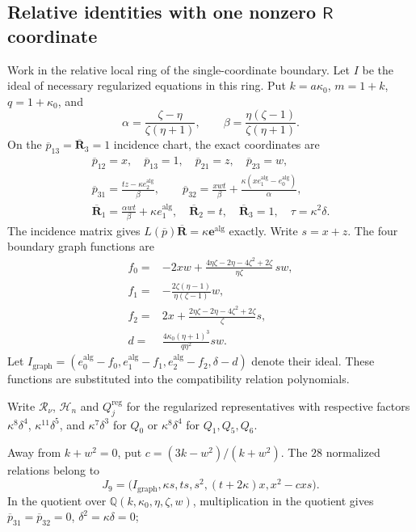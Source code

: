 \documentclass[11pt,a4paper]{article}
\numberwithin{equation}{section}
\theoremstyle{plain}
\theoremstyle{definition}
\theoremstyle{remark}
\begin{document}
\subsection{Relative identities with one nonzero \texorpdfstring{$\mathsf R$}{R} coordinate}
\label{appr3whole:identities}

Work in the relative local ring of the single-coordinate boundary. Let $I$ be the ideal of necessary regularized equations in this ring. Put $k=a\kappa_0 $, $m=1+k$, $q=1+\kappa_0 $, and
\[
 \alpha=\frac{\zeta -\eta }{\zeta (\eta +1)},\qquad
 \beta=\frac{\eta (\zeta -1)}{\zeta (\eta +1)}.
\]
On the $\overline p_{13}=\overline{\boldsymbol R}_3=1$ incidence chart, the exact coordinates are
\[
\begin{gathered}
 \overline p_{12}=x,\quad \overline p_{13}=1,\quad \overline p_{21}=z,\quad \overline p_{23}=w,\\
 \overline p_{31}=\frac{tz-\kappa e_2^{\mathrm{alg}}}{\beta},\qquad
 \overline p_{32}=\frac{xwt}{\beta}+\frac{\kappa(xe_1^{\mathrm{alg}}-e_0^{\mathrm{alg}})}{\alpha},\\
 \overline{\boldsymbol R}_1=\frac{\alpha w t}{\beta}+\kappa e_1^{\mathrm{alg}},\quad
 \overline{\boldsymbol R}_2=t,\quad \overline{\boldsymbol R}_3=1,\quad \tau=\kappa^2\delta.
\end{gathered}
\]
The incidence matrix gives
$L(\overline p)\overline{\boldsymbol R}=\kappa\boldsymbol e^{\mathrm{alg}}$ exactly. Write $s=x+z$. The four boundary graph functions are
\[
\begin{aligned}
 f_0={}&-2xw+\frac{4\eta \zeta -2\eta -4\zeta ^2+2\zeta }{\eta \zeta }\,sw,\\
 f_1={}&-\frac{2\zeta (\eta -1)}{\eta (\zeta -1)}w,\\
 f_2={}&2x+\frac{2\eta \zeta -2\eta -4\zeta ^2+2\zeta }{\zeta }s,\\
 d={}&\frac{4\kappa_0 (\eta +1)^3}{q\eta ^2}sw.
\end{aligned}
\]
Let $I_{\mathrm{graph}}=(e_0^{\mathrm{alg}}-f_0,e_1^{\mathrm{alg}}-f_1,e_2^{\mathrm{alg}}-f_2,\delta-d)$ denote their
ideal. These functions are substituted into the compatibility relation
polynomials.

Write $\mathcal R_\nu$, $\mathcal H_n$ and $Q_j^{\mathrm{reg}}$ for the
regularized representatives with respective factors
$\kappa^8\delta^4$, $\kappa^{11}\delta^5$, and
$\kappa^7\delta^3$ for $Q_0$ or $\kappa^8\delta^4$
for $Q_1,Q_5,Q_6$.

Away from $k+w^2=0$, put $c=(3k-w^2)/(k+w^2)$. The
$28$ normalized relations belong to
\[
 J_9=\bigl(I_{\mathrm{graph}},\kappa s,ts,s^2,(t+2\kappa)x,x^2-cxs\bigr).
\]
In the quotient over $\mathbb Q(k,\kappa_0 ,\eta ,\zeta ,w)$, multiplication in the quotient gives
$\overline p_{31}=\overline p_{32}=0$, $\delta^2=\kappa\delta=0$; 
\end{document}

